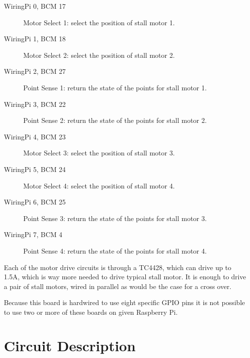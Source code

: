 \begin{description}
\item[WiringPi 0, BCM 17] Motor Select 1: select the position of stall motor 
1. 
\item[WiringPi 1, BCM 18] Motor Select 2: select the position of stall motor 
2. 
\item[WiringPi 2, BCM 27] Point Sense 1: return the state of the points for 
stall motor 1. 
\item[WiringPi 3, BCM 22] Point Sense 2: return the state of the points for 
stall motor 2. 
\item[WiringPi 4, BCM 23] Motor Select 3: select the position of stall motor 
3. 
\item[WiringPi 5, BCM 24] Motor Select 4: select the position of stall motor 
4. 
\item[WiringPi 6, BCM 25] Point Sense 3: return the state of the points for 
stall motor 3. 
\item[WiringPi 7, BCM 4] Point Sense 4: return the state of the points for 
stall motor 4. 
\end{description}

Each of the motor drive circuits is through a TC4428, which can drive up to
1.5A, which is way more needed to drive typical stall motor. It is enough to
drive a pair of stall motors, wired in parallel as would be the case for a
cross over. 

Because this board is hardwired to use eight specific GPIO pins it is not 
possible to use two or more of these boards on given Raspberry Pi.

\section{Circuit Description}

